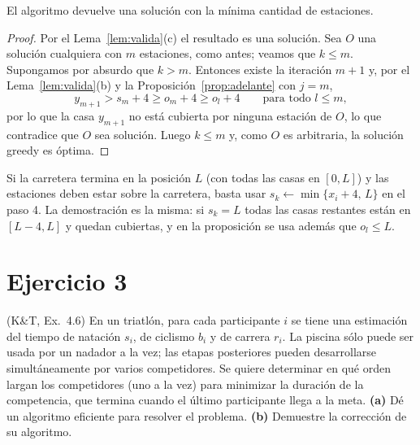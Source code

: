 \begin{teorema}
El algoritmo devuelve una solución con la mínima cantidad de estaciones.
\end{teorema}
\begin{proof}
Por el Lema~\ref{lem:valida}(c) el resultado es una solución. Sea $O$ una solución
cualquiera con $m$ estaciones, como antes; veamos que $k\le m$. Supongamos por absurdo que
$k>m$. Entonces existe la iteración $m+1$ y, por el Lema~\ref{lem:valida}(b) y la
Proposición~\ref{prop:adelante} con $j=m$,
\[
y_{m+1}>s_m+4\ge o_m+4\ge o_l+4\qquad\text{para todo } l\le m,
\]
por lo que la casa $y_{m+1}$ no está cubierta por ninguna estación de $O$, lo que contradice que
$O$ sea solución. Luego $k\le m$ y, como $O$ es arbitraria, la solución greedy es óptima.
\end{proof}

\begin{observacion}
Si la carretera termina en la posición $L$ (con todas las casas en $[0,L]$) y las estaciones deben
estar sobre la carretera, basta usar $s_k\gets\min\{x_i+4,\,L\}$ en el paso 4. La demostración es
la misma: si $s_k=L$ todas las casas restantes están en $[L-4,L]$ y quedan cubiertas, y en la
proposición se usa además que $o_l\le L$.
\end{observacion}

\section{Ejercicio 3}

\begin{enunciado}
(K\&T, Ex.~4.6) En un triatlón, para cada participante $i$ se tiene una estimación del tiempo de
natación $s_i$, de ciclismo $b_i$ y de carrera $r_i$. La piscina sólo puede ser usada por un
nadador a la vez; las etapas posteriores pueden desarrollarse simultáneamente por varios
competidores. Se quiere determinar en qué orden largan los competidores (uno a la vez) para
minimizar la duración de la competencia, que termina cuando el último participante llega a la
meta.
\textbf{(a)} Dé un algoritmo eficiente para resolver el problema.
\textbf{(b)} Demuestre la corrección de su algoritmo.
\end{enunciado}


